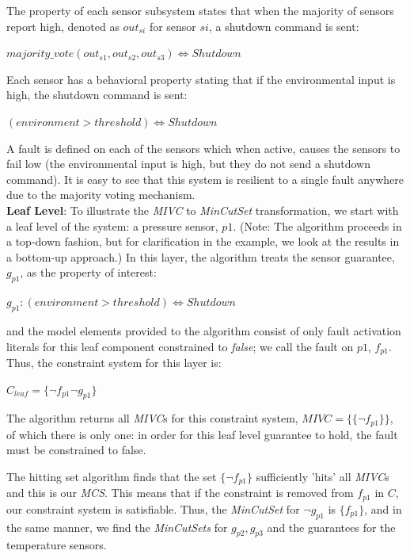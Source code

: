 The property of each sensor subsystem states that when the majority of sensors report high, denoted as $out_{si}$ for sensor $si$, a shutdown command is sent:
\begin{center}
    $majority\_vote(out_{s1}, out_{s2}, out_{s3}) \iff Shutdown$
    
\end{center}

Each sensor has a behavioral property stating that if the environmental input is high, the shutdown command is sent: 
\begin{center}
    $(environment > threshold) \iff Shutdown$
    
\end{center}

A fault is defined on each of the sensors which when active, causes the sensors to fail low (the environmental input is high, but they do not send a shutdown command). It is easy to see that this system is resilient to a single fault anywhere due to the majority voting mechanism. \\

\textbf{Leaf Level}: To illustrate the \textit{MIVC} to \textit{MinCutSet} transformation, we start with a leaf level of the system: a pressure sensor, $p1$. (Note: The \aivcalg algorithm proceeds in a top-down fashion, but for clarification in the example, we look at the results in a bottom-up approach.)  In this layer, the \aivcalg algorithm treats the sensor guarantee, $g_{p1}$, as the property of interest:
\begin{center}
    $g_{p1} : (environment > threshold) \iff Shutdown$
\end{center}
and the model elements provided to the \aivcalg algorithm consist of only fault activation literals for this leaf component constrained to \textit{false}; we call the fault on $p1$, $f_{p1}$. Thus, the constraint system for this layer is: 
\begin{center}
    $C_{leaf} = \{\neg f_{p1} \neg g_{p1}\}$
\end{center}

The \aivcalg algorithm returns all \textit{MIVC}s for this constraint system, $MIVC = \{\{\neg f_{p1}\}\}$, of which there is only one: in order for this leaf level guarantee to hold, the fault must be constrained to false. 

The hitting set algorithm finds that the set $\{\neg f_{p1}\}$ sufficiently 'hits' all \textit{MIVC}s and this is our \textit{MCS}. This means that if the constraint is removed from $f_{p1}$ in $C$, our constraint system is satisfiable. Thus, the \textit{MinCutSet} for $\neg g_{p1}$ is $\{f_{p1}\}$, and in the same manner, we find the \textit{MinCutSets} for $g_{p2}, g_{p3}$ and the guarantees for the temperature sensors. \\

